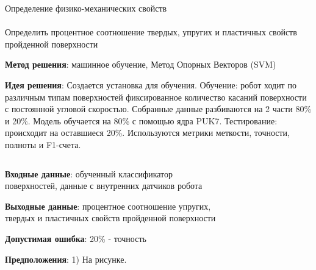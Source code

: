 \documentclass[aspectratio=169,xcolor=table,10pt]{beamer}
\begin{document}
\begin{frame}[t]{Определение физико-механических свойств}
\framesubtitle{}
    \small
    Определить процентное соотношение твердых, упругих и пластичных свойств пройденной поверхности

\textbf{Метод решения}: машинное обучение, Метод Опорных Векторов (SVM) 

\textbf{Идея решения}: Создается установка для обучения. Обучение: робот ходит по различным типам поверхностей фиксированное количество касаний поверхности с постоянной угловой скоростью. Собранные данные разбиваются на 2 части 80\% и 20\%. Модель обучается на 80\% с помощью ядра PUK7. Тестирование: происходит на оставшиеся 20\%.  Используются метрики меткости, точности, полноты и F1-счета.

\begin{columns}[T,onlytextwidth]
    \begin{column}{0.44\textwidth}
        \textbf{Входные данные}: обученный классификатор 
поверхностей, данные с внутренних 
датчиков робота

\textbf{Выходные данные}: процентное 
соотношение упругих, твердых 
и пластичных свойств 
пройденной поверхности

\textbf{Допустимая ошибка}: 20\% - точность

\textbf{Предположения}: 1) На рисунке.

    \end{column}
    \begin{column}{0.54\textwidth}
        \vspace{-0.9cm}
        \begin{figure}[H]
            \begin{subfigure}[b]{0.3\textwidth}
                \centering\includegraphics[height=1.5cm,width=1\textwidth,keepaspectratio]{surface_types/moss.jpg}
            \end{subfigure}
            \hfill
            \begin{subfigure}[b]{0.3\textwidth}
                \centering\includegraphics[height=1.5cm,width=1\textwidth,keepaspectratio]{surface_types/lava.jpg}
            \end{subfigure}
            \hfill
            \begin{subfigure}[b]{0.3\textwidth}
                \centering\includegraphics[height=1.5cm,width=1\textwidth,keepaspectratio]{surface_types/moul.png}
            \end{subfigure}
    

\end{figure}
\end{column}
\end{columns}
\end{frame}
\end{document}
